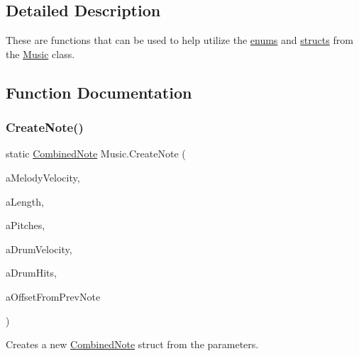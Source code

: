 \subsection{Detailed Description}
These are functions that can be used to help utilize the \hyperlink{group___music_enums}{enums} and \hyperlink{group___music_structs}{structs} from the \hyperlink{class_music}{Music} class. 

\subsection{Function Documentation}
\mbox{\label{group___music_static_func_gaaf74885e43eb623f64f961985fadcd08}} 
\subsubsection{\texorpdfstring{Create\+Note()}{CreateNote()}}
{\footnotesize\ttfamily static \hyperlink{group___music_structs_struct_music_1_1_combined_note}{Combined\+Note} Music.\+Create\+Note (\begin{DoxyParamCaption}\item[{int}]{a\+Melody\+Velocity,  }\item[{\hyperlink{group___music_enums_gaf11b5f079adbb21c800b9eca1c5c3cbd}{N\+O\+T\+E\+\_\+\+L\+E\+N\+G\+TH}}]{a\+Length,  }\item[{\hyperlink{group___music_enums_ga508f69b199ea518f935486c990edac1d}{P\+I\+T\+CH} \mbox{[}$\,$\mbox{]}}]{a\+Pitches,  }\item[{int}]{a\+Drum\+Velocity,  }\item[{\hyperlink{group___music_enums_gade475b4382c7066d1af13e7c13c029b6}{D\+R\+UM} \mbox{[}$\,$\mbox{]}}]{a\+Drum\+Hits,  }\item[{\hyperlink{group___music_enums_gaf11b5f079adbb21c800b9eca1c5c3cbd}{N\+O\+T\+E\+\_\+\+L\+E\+N\+G\+TH}}]{a\+Offset\+From\+Prev\+Note }\end{DoxyParamCaption})\hspace{0.3cm}{\ttfamily [static]}}



Creates a new \hyperlink{group___music_structs_struct_music_1_1_combined_note}{Combined\+Note} struct from the parameters. 


